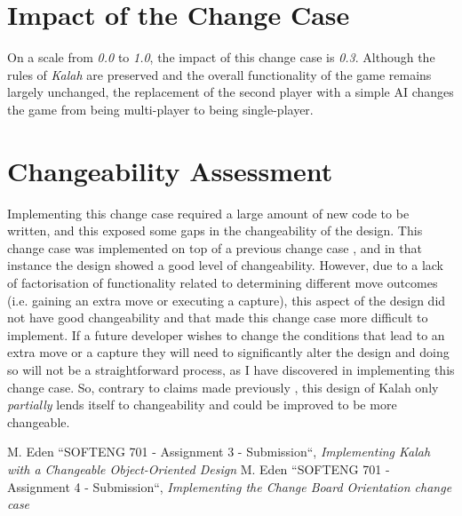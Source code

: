 \documentclass[10pt, a4paper, conference]{IEEEtran}
\begin{document}
\section{Impact of the Change Case}
On a scale from \textit{0.0} to \textit{1.0}, the impact of this change case is
\textit{0.3}. Although the rules of \textit{Kalah} are preserved and the
overall functionality of the game remains largely unchanged, the replacement 
of the second player with a simple AI changes the game from being multi-player 
to being single-player.

\section{Changeability Assessment}
Implementing this change case required a large amount of new code to be
written, and this exposed some gaps in the changeability of the design. This
change case was implemented on top of a previous change case
\cite{a4-change-case}, and in that instance the design showed a good level of 
changeability. However, due to a lack of factorisation of functionality related
to determining different move outcomes (i.e. gaining an extra move or executing
a capture), this aspect of the design did not have good changeability and that
made this change case more difficult to implement. If a future developer wishes 
to change the conditions that lead to an extra move or a capture they will need 
to significantly alter the design and doing so will not be a straightforward process, 
as I have discovered in implementing this change case. So, contrary to claims made 
previously \cite{a3-design}, this design of Kalah only \textit{partially} lends itself 
to changeability and could be improved to be more changeable.

\begin{thebibliography}{00}
   M. Eden ``SOFTENG 701 - Assignment 3 - Submission``,
    \textit{Implementing Kalah with a Changeable Object-Oriented Design}
   M. Eden ``SOFTENG 701 - Assignment 4 - Submission``,
    \textit{Implementing the Change Board Orientation change case}
\end{thebibliography}
\end{document}
